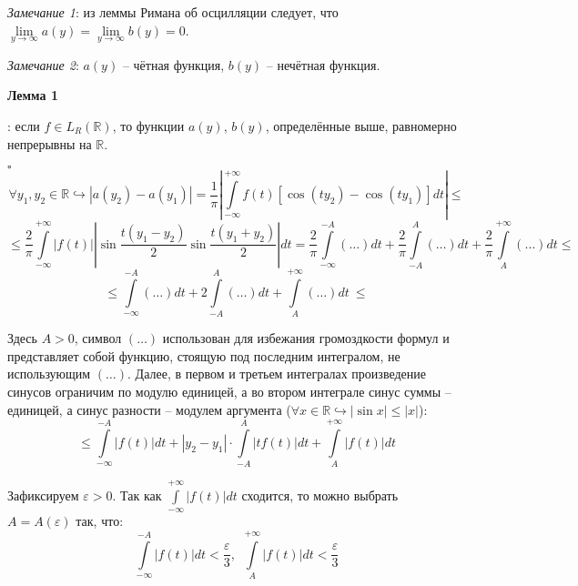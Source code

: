 \documentclass[12pt, a4paper, reqno]{article}
\begin{document}
    \textit{Замечание 1}: из леммы Римана об осцилляции следует, что $\lim\limits_{y \to \infty} a(y) =
    \lim\limits_{y \to \infty} b(y) = 0$.

    \textit{Замечание 2}: $a(y)$ -- чётная функция, $b(y)$ -- нечётная функция.

    \hypertarget{FT-continuity}{\textbf{Лемма 1}}: если $f \in L_R(\mathbb{R})$, то функции $a(y)$,
    $b(y)$, определённые выше, равномерно непрерывны на $\mathbb{R}$.

    $\square$
    \begin{equation*}
        \forall y_1, y_2 \in \mathbb{R} \hookrightarrow
        |a(y_2) - a(y_1)| =
        \frac{1}{\pi}\left|\int\limits_{-\infty}^{+\infty} f(t)[\cos{(ty_2)} - \cos{(ty_1)}]dt\right| \leq
    \end{equation*}
    \begin{equation*}
        \leq \frac{2}{\pi}\int\limits_{-\infty}^{+\infty}
            |f(t)|\left|\sin{\frac{t(y_1 - y_2)}{2}}\sin{\frac{t(y_1 + y_2)}{2}}\right|dt =
        \frac{2}{\pi}\int\limits_{-\infty}^{-A} (\ldots)dt +
        \frac{2}{\pi}\int\limits_{-A}^{A} (\ldots)dt +
        \frac{2}{\pi}\int\limits_{A}^{+\infty} (\ldots)dt \leq
    \end{equation*}
    \begin{equation*}
        \leq \int\limits_{-\infty}^{-A} (\ldots)dt + 2\int\limits_{-A}^{A} (\ldots)dt +
        \int\limits_{A}^{+\infty} (\ldots)dt\ \boxed{\leq}
    \end{equation*}

    Здесь $A > 0$, символ $(\ldots)$ использован для избежания громоздкости формул и представляет
    собой функцию, стоящую под последним интегралом, не использующим $(\ldots)$. Далее, в первом
    и третьем интегралах произведение синусов ограничим по модулю единицей, а во втором
    интеграле синус суммы -- единицей, а синус разности -- модулем аргумента
    ($\forall x \in \mathbb{R} \hookrightarrow |\sin{x}| \leq |x|$):
    \begin{equation*}
        \boxed{\leq} \int\limits_{-\infty}^{-A} |f(t)|dt +
        |y_2 - y_1| \cdot \int\limits_{-A}^{A} |tf(t)| dt +
        \int\limits_{A}^{+\infty} |f(t)|dt
    \end{equation*}

    Зафиксируем $\varepsilon > 0$. Так как $\int\limits_{-\infty}^{+\infty}|f(t)|dt$ сходится, то
    можно выбрать $A = A(\varepsilon)$ так, что:
    \begin{equation*}
        \int\limits_{-\infty}^{-A} |f(t)|dt < \frac{\varepsilon}{3},\ \
        \int\limits_{A}^{+\infty} |f(t)|dt < \frac{\varepsilon}{3}
    \end{equation*}
\end{document}

